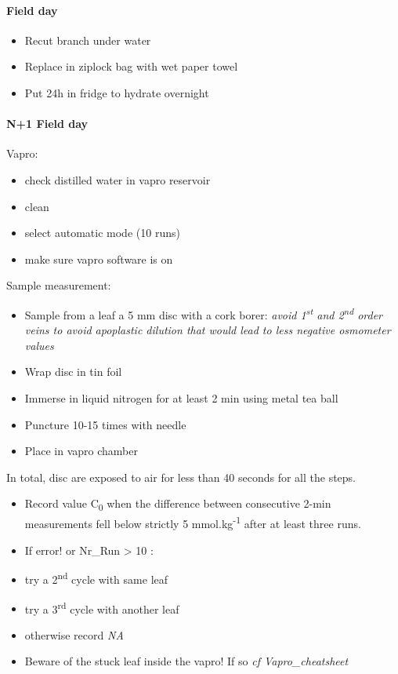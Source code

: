 \documentclass[
  12pt,
  american,
  a4paper,
  extrafontsizes,onecolumn,openright
  ]{memoir}
\providecommand{\tightlist}{%
  \setlength{\itemsep}{0pt}\setlength{\parskip}{0pt}}
\begin{document}
\hypertarget{field-day}{%
\paragraph{Field day}\label{field-day}}

\begin{itemize}
\tightlist
\item
  Recut branch under water
\item
  Replace in ziplock bag with wet paper towel
\item
  Put 24h in fridge to hydrate overnight
\end{itemize}

\hypertarget{n1-field-day}{%
\paragraph{N+1 Field day}\label{n1-field-day}}

Vapro:

\begin{itemize}
\tightlist
\item
  check distilled water in vapro reservoir
\item
  clean
\item
  select automatic mode (10 runs)
\item
  make sure vapro software is on
\end{itemize}

Sample measurement:

\begin{itemize}
\tightlist
\item
  Sample from a leaf a 5 mm disc with a cork borer: \emph{avoid 1\textsuperscript{st} and 2\textsuperscript{nd} order veins to avoid apoplastic dilution that would lead to less negative osmometer values}
\item
  Wrap disc in tin foil
\item
  Immerse in liquid nitrogen for at least 2 min using metal tea ball
\item
  Puncture 10-15 times with needle
\item
  Place in vapro chamber
\end{itemize}

In total, disc are exposed to air for less than 40 seconds for all the steps.

\begin{itemize}
\item
  Record value C\textsubscript{0} when the difference between consecutive 2-min measurements fell below strictly 5 mmol.kg\textsuperscript{-1} after at least three runs.
\item
  If error! or Nr\_Run \textgreater{} 10 :
\item
  try a 2\textsuperscript{nd} cycle with same leaf
\item
  try a 3\textsuperscript{rd} cycle with another leaf
\item
  otherwise record \emph{NA}
\item
  Beware of the stuck leaf inside the vapro! If so \emph{cf Vapro\_cheatsheet}
\end{itemize}
\end{document}
